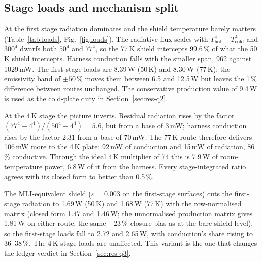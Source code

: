 \documentclass[preprint,12pt]{elsarticle}
\begin{document}
\subsection{Stage loads and mechanism split}
\label{sec:res-q1-loads}

At the first stage radiation dominates and the shield temperature barely matters
(Table~\ref{tab:loads}, Fig.~\ref{fig:loads}). The radiative flux scales with
$T_{\mathrm{hot}}^4-T_{\mathrm{cold}}^4$ and $300^4$ dwarfs both $50^4$ and $77^4$, so the
77\,K shield intercepts 99.6\,\% of what the 50\,K shield intercepts. Harness conduction
falls with the smaller span, 962 against 1029\,mW. The first-stage loads are 8.39\,W
(50\,K) and 8.30\,W (77\,K); the emissivity band of $\pm50$\,\% moves them between 6.5 and
12.5\,W but leaves the 1\,\% difference between routes unchanged. The conservative production
value of 9.4\,W is used as the cold-plate duty in Section~\ref{sec:res-q2}.

At the 4\,K stage the picture inverts. Residual radiation rises by the factor
$(77^4-4^4)/(50^4-4^4)=5.6$, but from a base of 3\,mW; harness conduction rises by the factor
2.31 from a base of 70\,mW. The 77\,K route therefore delivers 106\,mW more to the 4\,K plate:
92\,mW of conduction and 15\,mW of radiation, 86\,\% conductive. Through the ideal 4\,K
multiplier of 74 this is 7.9\,W of room-temperature power, 6.8\,W of it from the harness.
Every stage-integrated ratio agrees with its closed form to better than 0.5\,\%.

The MLI-equivalent shield ($\varepsilon=0.003$ on the first-stage surfaces) cuts the first-stage
radiation to 1.69\,W (50\,K) and 1.68\,W (77\,K) with the row-normalised matrix (closed form
1.47 and 1.46\,W; the unnormalised production matrix gives 1.81\,W on either route, the same
$+23$\,\% closure bias as at the bare-shield level), so the first-stage loads fall to 2.72 and
2.65\,W, with conduction's share rising to 36--38\,\%. The 4\,K-stage loads are unaffected. This variant is the one that
changes the ledger verdict in Section~\ref{sec:res-q3}.
\end{document}
